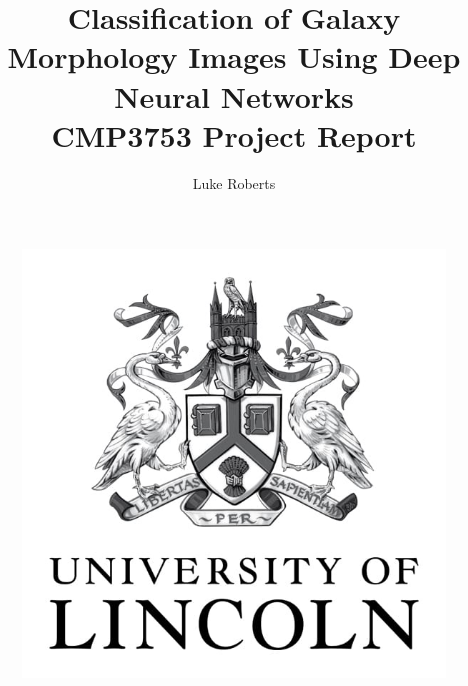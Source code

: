 \documentclass[12pt,runningheads]{llncs}
\begin{document}
\title{
    Classification of Galaxy Morphology Images Using Deep Neural Networks
 \\ \large CMP3753 Project Report}


\author{Luke Roberts}


\maketitle

\begin{figure}[h]
    \includegraphics[scale=0.6]{UOL_Logo.jpg}
    \centering
\end{figure}

\newpage
\end{document}
